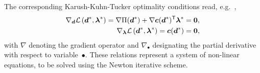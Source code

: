 \documentclass[11pt]{article}
\newcommand{\M}[1]{{\boldsymbol #1}}
\newcommand{\lay}[1]{^{(#1)}}
\newcommand{\Etot}{\Pi}
\newcommand{\trn}{{\sf ^T}}        \newcommand{\eL}[2]{L_{#1}\lay{#2}}
\newcommand{\Md}{\M{d}}
\begin{document}
The corresponding Karush-Kuhn-Tucker optimality conditions read,
e.g.~\cite[Chapter~14]{Bonnans:2003:NOTPA},
\begin{subequations}\label{eq:opt_conditions}
\begin{align}
\nabla_{\Md} 
\mathcal{L}\left( 
 \Md^*, \M{\lambda}^* 
\right)
=  
\nabla \Etot( \Md^* )
+ 
\nabla \M{c}( \Md^* )\trn 	
\M{\lambda}^*
& =  
\M{0},
\label{eq:opt_conditions_1}
\\
\nabla_{\M{\lambda}} 
\mathcal{L}\left( 
 \Md^*, \M{\lambda}^* 
\right)
=
\M{c}( \Md^* )
& =  
\M{0},
\label{eq:opt_conditions_2}
\end{align} 
\end{subequations}
with $\nabla$ denoting the gradient operator and $\nabla_{\bullet}$ designating
the partial derivative with respect to variable~$\bullet$. These relations
represent a system of non-linear equations, to be solved using the Newton
iterative scheme.
\end{document}
